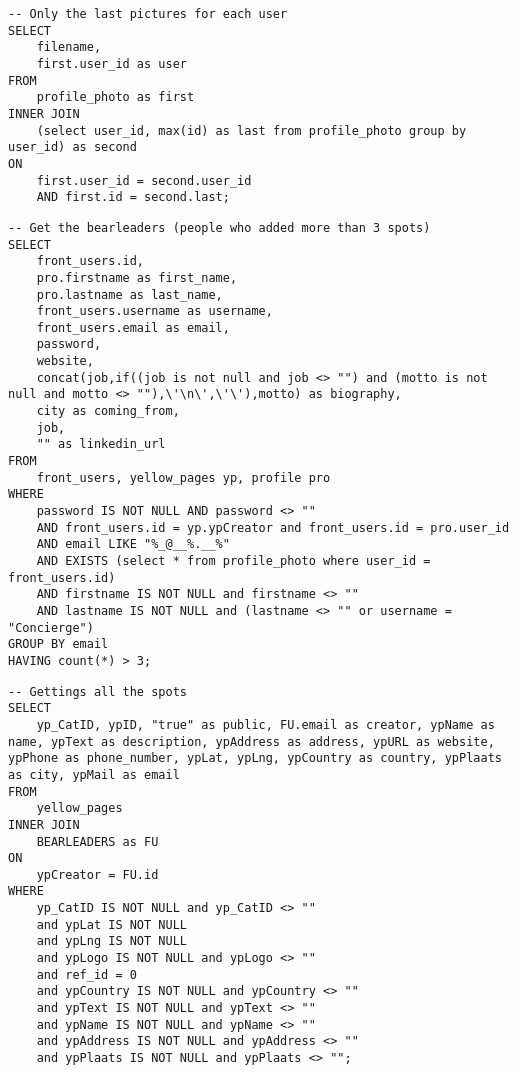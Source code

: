 \sql
\begin{lstlisting}
-- Only the last pictures for each user
SELECT
    filename,
    first.user_id as user
FROM
    profile_photo as first
INNER JOIN
    (select user_id, max(id) as last from profile_photo group by user_id) as second
ON
    first.user_id = second.user_id
    AND first.id = second.last;
\end{lstlisting}
\begin{lstlisting}
-- Get the bearleaders (people who added more than 3 spots)
SELECT
    front_users.id,
    pro.firstname as first_name,
    pro.lastname as last_name,
    front_users.username as username,
    front_users.email as email,
    password,
    website,
    concat(job,if((job is not null and job <> "") and (motto is not null and motto <> ""),\'\n\',\'\'),motto) as biography,
    city as coming_from,
    job,
    "" as linkedin_url
FROM
    front_users, yellow_pages yp, profile pro
WHERE
    password IS NOT NULL AND password <> ""
    AND front_users.id = yp.ypCreator and front_users.id = pro.user_id
    AND email LIKE "%_@__%.__%"
    AND EXISTS (select * from profile_photo where user_id = front_users.id)
    AND firstname IS NOT NULL and firstname <> ""
    AND lastname IS NOT NULL and (lastname <> "" or username = "Concierge")
GROUP BY email
HAVING count(*) > 3;
\end{lstlisting}
\begin{lstlisting}
-- Gettings all the spots
SELECT
    yp_CatID, ypID, "true" as public, FU.email as creator, ypName as name, ypText as description, ypAddress as address, ypURL as website, ypPhone as phone_number, ypLat, ypLng, ypCountry as country, ypPlaats as city, ypMail as email
FROM
    yellow_pages
INNER JOIN
    BEARLEADERS as FU
ON
    ypCreator = FU.id
WHERE
    yp_CatID IS NOT NULL and yp_CatID <> ""
    and ypLat IS NOT NULL
    and ypLng IS NOT NULL
    and ypLogo IS NOT NULL and ypLogo <> ""
    and ref_id = 0
    and ypCountry IS NOT NULL and ypCountry <> ""
    and ypText IS NOT NULL and ypText <> ""
    and ypName IS NOT NULL and ypName <> ""
    and ypAddress IS NOT NULL and ypAddress <> ""
    and ypPlaats IS NOT NULL and ypPlaats <> "";
\end{lstlisting}